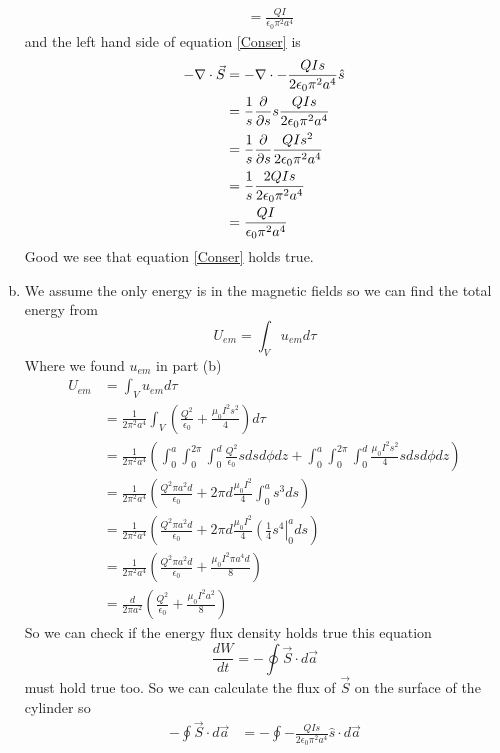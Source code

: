 \documentclass[11pt]{article}
\numberwithin{equation}{section}
\newcommand{\grad}{\bold\nabla}
\newcommand{\da}{d\vec{a}}
\begin{document}
\begin{enumerate}[(a)]
\begin{align*}
&= \frac{QI}{\epsilon_0\pi^2 a^4}
\end{align*}
and the left hand side of equation \ref{Conser} is
\begin{align*}
-\grad\cdot\vec{S} &= -\grad\cdot-\frac{QIs}{2\epsilon_0\pi^2 a^4}\hat{s}\\
&= \frac{1}{s}\frac{\partial}{\partial s}s\frac{QIs}{2\epsilon_0\pi^2 a^4}\\
&= \frac{1}{s}\frac{\partial}{\partial s}\frac{QIs^2}{2\epsilon_0\pi^2 a^4}\\
&= \frac{1}{s}\frac{2QIs}{2\epsilon_0\pi^2 a^4}\\
&= \frac{QI}{\epsilon_0\pi^2 a^4}
\end{align*}
Good we see that equation \ref{Conser} holds true.

\item
We assume the only energy is in the magnetic fields so we can find the total energy from 
\begin{equation}
U_{em} = \int_Vu_{em}d\tau
\end{equation}
Where we found $u_{em}$ in part (b)
\begin{align*}
U_{em} &= \int_Vu_{em}d\tau\\
&=\frac{1}{2\pi^2 a^4}\int_V\left(\frac{Q^2}{\epsilon_0} + \frac{\mu_0I^2s^2}{4}\right)d\tau\\
&=\frac{1}{2\pi^2 a^4}\left(\int_0^{a}\int_0^{2\pi}\int_0^{d}\frac{Q^2}{\epsilon_0}sdsd\phi dz + \int_0^{a}\int_0^{2\pi}\int_0^{d}\frac{\mu_0I^2s^2}{4}sdsd\phi dz\right)\\
&=\frac{1}{2\pi^2 a^4}\left(\frac{Q^2\pi a^2d}{\epsilon_0} + 2\pi d\frac{\mu_0I^2}{4}\int_0^{a}s^3ds\right)\\
&=\frac{1}{2\pi^2 a^4}\left(\frac{Q^2\pi a^2d}{\epsilon_0} + 2\pi d\frac{\mu_0I^2}{4}\left(\frac{1}{4}s^4\right|_0^ads\right)\\
&=\frac{1}{2\pi^2 a^4}\left(\frac{Q^2\pi a^2d}{\epsilon_0} + \frac{\mu_0I^2\pi a^4d}{8}\right)\\
&=\frac{d}{2\pi a^2}\left(\frac{Q^2}{\epsilon_0} + \frac{\mu_0I^2a^2}{8}\right)
\end{align*}
So we can check if the energy flux density holds true this equation
\begin{equation}
\frac{dW}{dt} = -\oint\vec{S}\cdot\da
\label{EnerFlux}
\end{equation}
must hold true too. So we can calculate the flux of $\vec{S}$ on the surface of the cylinder so
\begin{align*}
-\oint\vec{S}\cdot\da &= -\oint-\frac{QIs}{2\epsilon_0\pi^2 a^4}\hat{s}\cdot\da\\

\end{align*}
\end{enumerate}
\end{document}
